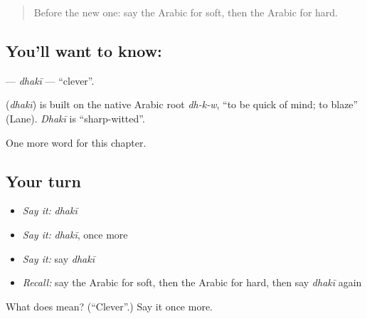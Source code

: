 \label{lesson:AR-C152-dhaki}



\begin{quote}
Before the new one: say the Arabic for soft, then the Arabic for hard.
\end{quote}

\subsection*{You'll want to know: }
\textbf{} — \emph{dhakī} — \textquotedblleft{}clever\textquotedblright{}.

\begin{cousinweb}
\textbf{} (\emph{dhakī}) is built on the native Arabic root \emph{dh-k-w}, \textquotedblleft{}to be quick of mind; to blaze\textquotedblright{} (Lane). \emph{Dhakī} is \textquotedblleft{}sharp-witted\textquotedblright{}.
\end{cousinweb}

\begin{grammarlens}[title={What you've built}]
One more word for this chapter.
\end{grammarlens}

\subsection*{Your turn}
\begin{itemize}
\raggedright
  \item \emph{Say it:} \emph{dhakī}
  \item \emph{Say it:} \emph{dhakī}, once more
  \item \emph{Say it:} say \emph{dhakī}
  \item \emph{Recall:} say the Arabic for soft, then the Arabic for hard, then say \emph{dhakī} again
\end{itemize}

\begin{tcolorbox}[breakable,colback=teal!4,colframe=teal!35!black,title={Before you move on}]
What does  mean? (\textquotedblleft{}Clever\textquotedblright{}.) Say it once more.
\end{tcolorbox}
